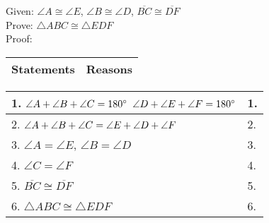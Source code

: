 Given: $\angle{A}\cong \angle{E} $, $\angle{B}\cong \angle{D} $, $\overline{BC}\cong\overline{DF} $\\
Prove: $\triangle ABC \cong \triangle EDF$\\
Proof: 
\begin{center}

\noindent\begin{minipage}{27em}

\begin{tabularx}{\textwidth}{|Y|Y|}
\hline
\textbf{Statements} & \textbf{Reasons}  \\
\hline
\end{tabularx} 

\par\vskip1pt

\begin{tabularx}{\textwidth}{|X|X|}
\hline
1. $\angle{A}+\angle{B} +\angle{C} = 180 \degree  $ \newline $\angle{D}+\angle{E} +\angle{F} = 180 \degree$ & 1.  \\
\hline
2. $\angle{A}+\angle{B} +\angle{C} = \newline  \angle{E}+\angle{D} +\angle{F} $ & 2.  \\
\hline
3. $\angle{A} = \angle{E} $, $\angle{B}  = \angle{D} $ & 3.  \\
\hline
4. $\angle{C} = \angle{F}$ & 4.  \\
\hline
5. $\overline{BC} \cong \overline{DF} $ & 5.  \\
\hline
6. $\triangle ABC \cong \triangle EDF$ & 6.  \\
\hline
\end{tabularx} 
\end{minipage}

\end{center} 

